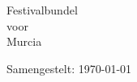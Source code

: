 \documentclass[10pt,a4paper,twoside]{article}
\begin{document}
\begin{center}
\Huge{Festivalbundel\\voor\\Murcia}
\end{center}
\vspace*{\fill}
\tableofcontents
\vspace{1em}
\hfill\small{Samengestelt: \today}









\end{document}

